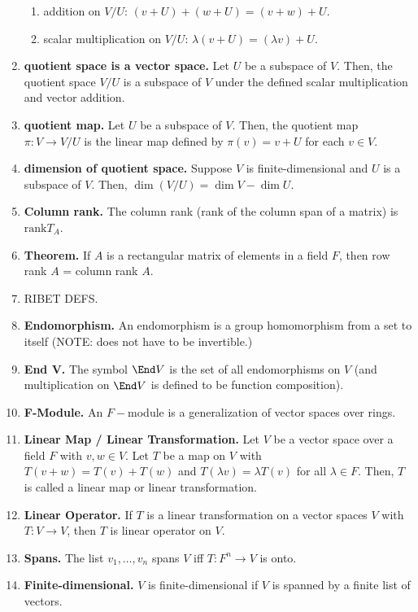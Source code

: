 \begin{enumerate}
	\begin{enumerate}
		\item addition on $V/U$: $(v + U) + (w + U) = (v+w) + U$. 
		\item scalar multiplication on $V/U$: $\lambda(v + U) = (\lambda v) + U$. 
	\end{enumerate}
	\item \textbf{quotient space is a vector space. } Let $U$ be a subspace of $V$. Then, the quotient space $V/U$ is a subspace of $V$ under the defined scalar multiplication and vector addition. 
	\item \textbf{quotient map. } Let $U$ be a subspace of $V$. Then, the quotient map $\pi: V \to V/U$ is the linear map defined by $\pi(v) = v + U$ for each $v \in V$. 
	\item \textbf{dimension of quotient space. } Suppose $V$ is finite-dimensional and $U$ is a subspace of $V$. Then, $\dim (V/U) = \dim V - \dim U$.
	\item \textbf{Column rank. } The column rank (rank of the column span of a matrix) is $\textrm{rank}T_A$. 
	\item \textbf{Theorem. } If $A$ is a rectangular matrix of elements in a field $F$, then row rank $A$ = column rank $A$.  
	\item RIBET DEFS. 
	\item \textbf{Endomorphism. } An endomorphism is a group homomorphism from a set to itself (NOTE: does not have to be invertible.)
    \item \textbf{End V. } The symbol $\End V$ is the set of all endomorphisms on $V$ (and multiplication on $\End V$ is defined to be function composition). 
    \item \textbf{F-Module. } An $F-$module is a generalization of vector spaces over rings. 
    \item \textbf{Linear Map / Linear Transformation. } Let $V$ be a vector space over a field $F$ with $v,w \in V$. Let $T$ be a map on $V$ with $T(v+w) = T(v) + T(w)$ and $T(\lambda v) = \lambda T(v)$ for all $\lambda \in F$. Then, $T$ is called a linear map or linear transformation. 
    \item \textbf{Linear Operator. } If $T$ is a linear transformation on a vector spaces $V$ with $T: V \to V$, then $T$ is linear operator on $V$. 
    \item \textbf{Spans. } The list $v_1,\dots,v_n$ spans $V$ iff $T: F^n \to V$ is onto. 
        \item \textbf{Finite-dimensional. } $V$ is finite-dimensional if $V$ is spanned by a finite list of vectors. 

\end{enumerate}
